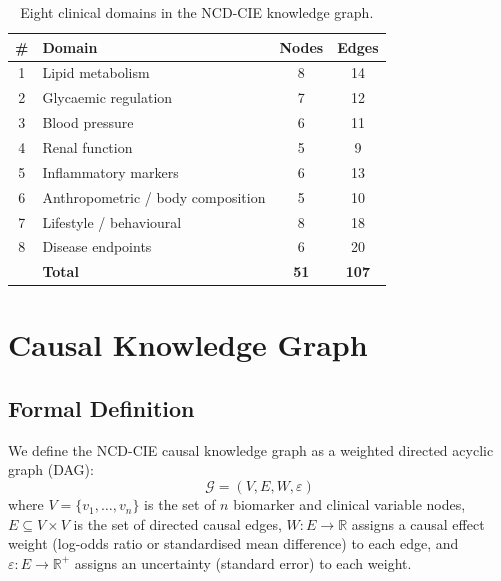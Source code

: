 \documentclass[runningheads]{llncs}
\begin{document}
\begin{table}[t]
\centering
\caption{Eight clinical domains in the NCD-CIE knowledge graph.}
\label{tab:domains}
\small
\begin{tabular}{@{}clcc@{}}
\toprule
\textbf{\#} & \textbf{Domain} & \textbf{Nodes} & \textbf{Edges} \\
\midrule
1 & Lipid metabolism        & 8  & 14 \\
2 & Glycaemic regulation    & 7  & 12 \\
3 & Blood pressure          & 6  & 11 \\
4 & Renal function          & 5  & 9  \\
5 & Inflammatory markers    & 6  & 13 \\
6 & Anthropometric / body composition & 5 & 10 \\
7 & Lifestyle / behavioural & 8  & 18 \\
8 & Disease endpoints       & 6  & 20 \\
\midrule
  & \textbf{Total}          & \textbf{51} & \textbf{107} \\
\bottomrule
\end{tabular}
\end{table}

\section{Causal Knowledge Graph}\label{sec:kg}

\subsection{Formal Definition}\label{sec:formal}

We define the NCD-CIE causal knowledge graph as a weighted directed
acyclic graph (DAG):
\begin{equation}\label{eq:graph}
\mathcal{G} = (V, E, W, \varepsilon)
\end{equation}
where $V=\{v_1,\ldots,v_n\}$ is the set of $n$ biomarker and clinical
variable nodes, $E \subseteq V \times V$ is the set of directed causal
edges, $W: E \rightarrow \mathbb{R}$ assigns a causal effect weight
(log-odds ratio or standardised mean difference) to each edge, and
$\varepsilon: E \rightarrow \mathbb{R}^+$ assigns an uncertainty
(standard error) to each weight.
\end{document}
